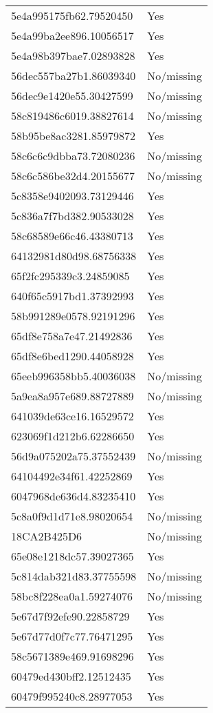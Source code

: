 \begin{tabular}{ll}
5e4a995175fb62.79520450 & Yes \\
5e4a99ba2ee896.10056517 & Yes \\
5e4a98b397bae7.02893828 & Yes \\
56dec557ba27b1.86039340 & No/missing \\
56dec9e1420e55.30427599 & No/missing \\
58c819486c6019.38827614 & No/missing \\
58b95be8ac3281.85979872 & Yes \\
58c6c6c9dbba73.72080236 & No/missing \\
58c6c586be32d4.20155677 & No/missing \\
5c8358e9402093.73129446 & Yes \\
5c836a7f7bd382.90533028 & Yes \\
58c68589e66c46.43380713 & Yes \\
64132981d80d98.68756338 & Yes \\
65f2fc295339c3.24859085 & Yes \\
640f65c5917bd1.37392993 & Yes \\
58b991289e0578.92191296 & Yes \\
65df8e758a7e47.21492836 & Yes \\
65df8e6bed1290.44058928 & Yes \\
65eeb996358bb5.40036038 & No/missing \\
5a9ea8a957e689.88727889 & No/missing \\
641039de63ce16.16529572 & Yes \\
623069f1d212b6.62286650 & Yes \\
56d9a075202a75.37552439 & No/missing \\
64104492e34f61.42252869 & Yes \\
6047968de636d4.83235410 & Yes \\
5c8a0f9d1d71e8.98020654 & No/missing \\
18CA2B425D6 & No/missing \\
65e08e1218dc57.39027365 & Yes \\
5c814dab321d83.37755598 & No/missing \\
58bc8f228ea0a1.59274076 & No/missing \\
5e67d7f92efe90.22858729 & Yes \\
5e67d77d0f7c77.76471295 & Yes \\
58c5671389e469.91698296 & Yes \\
60479ed430bff2.12512435 & Yes \\
60479f995240c8.28977053 & Yes \\

\end{tabular}
